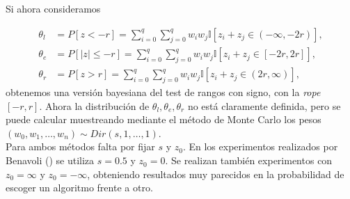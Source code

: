 	Si ahora consideramos
	
\begin{align*}
	\theta_l &= P[ z < -r ] = 
				\sum\limits_{i = 0}^q 
				\sum\limits_{j = 0}^q 
					w_i w_j 
					\mathbb{I}[ z_i + z_j 
								\in (-\infty,-2r)],\\
	\theta_e &= P[ |z| \leq -r ] = 
				\sum\limits_{i = 0}^q 
				\sum\limits_{j = 0}^q 
					w_i w_j 
					\mathbb{I}[ z_i + z_j 
								\in [-2r,2r]], \\
	\theta_r &= P[ z > r ] = 
				\sum\limits_{i = 0}^q 
				\sum\limits_{j = 0}^q 
					w_i w_j 
					\mathbb{I}[ z_i + z_j 
								\in (2r, \infty)],
\end{align*}
	obtenemos una versión bayesiana del 
test de rangos con signo, con la \textit{rope} $[-r,r]$. 
Ahora la distribución de 
$\theta_l, \theta_e, \theta_r$ no está claramente definida,
pero se puede calcular muestreando mediante el método
de Monte Carlo los pesos $(w_0, w_1, \dots, w_n) \sim 
Dir(s,1, \dots, 1)$.\\
	Para ambos métodos falta por fijar $s$ y $z_0$. 
En los experimentos realizados por Benavoli 
(\cite{DBLP:journals/corr/BenavoliCDZ16}) se utiliza $s=0.5$ y $z_0=0$. Se realizan 
también experimentos con $z_0 = \infty$ y $z_0 = -\infty$, 
obteniendo resultados muy parecidos en la probabilidad
de escoger un algoritmo frente a otro.



